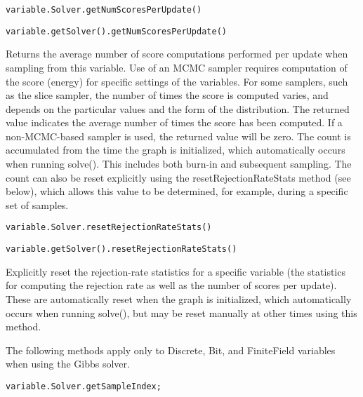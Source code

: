 \ifmatlab
\begin{lstlisting}
variable.Solver.getNumScoresPerUpdate()
\end{lstlisting}
\fi

\ifjava
\begin{lstlisting}
variable.getSolver().getNumScoresPerUpdate()
\end{lstlisting}
\fi

Returns the average number of score computations performed per update when sampling from this variable.  Use of an MCMC sampler requires computation of the score (energy) for specific settings of the variables.  For some samplers, such as the slice sampler, the number of times the score is computed varies, and depends on the particular values and the form of the distribution.  The returned value indicates the average number of times the score has been computed.  If a non-MCMC-based sampler is used, the returned value will be zero.  The count is accumulated from the time the graph is initialized, which automatically occurs when running solve().  This includes both burn-in and subsequent sampling.  The count can also be reset explicitly using the resetRejectionRateStats method (see below), which allows this value to be determined, for example, during a specific set of samples.

\ifmatlab
\begin{lstlisting}
variable.Solver.resetRejectionRateStats()
\end{lstlisting}
\fi

\ifjava
\begin{lstlisting}
variable.getSolver().resetRejectionRateStats()
\end{lstlisting}
\fi

Explicitly reset the rejection-rate statistics for a specific variable (the statistics for computing the rejection rate as well as the number of scores per update).  These are automatically reset when the graph is initialized, which automatically occurs when running solve(), but may be reset manually at other times using this method.




The following methods apply only to Discrete, Bit, and FiniteField variables when using the Gibbs solver.

\ifmatlab
\begin{lstlisting}
variable.Solver.getSampleIndex;
\end{lstlisting}
\fi


